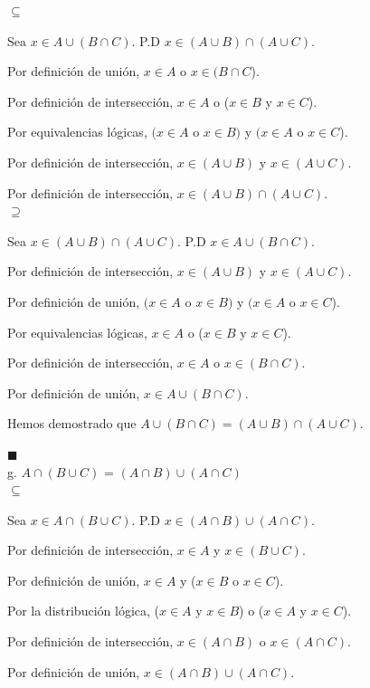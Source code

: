 \documentclass{article}
\begin{document}
\(\subseteq\)

Sea \(x \in A \cup (B \cap C)\). P.D \(x \in (A \cup B) \cap (A \cup C)\).

Por definición de unión, \(x \in A\) o \(x \in (B \cap C\)).

Por definición de intersección, \(x \in A\) o (\(x \in B\) y \(x \in C\)).

Por equivalencias lógicas, \((x \in A\) o \(x \in B)\) y \((x \in A\) o \(x \in C\)).

Por definición de intersección, \(x \in (A \cup B)\) y \(x \in (A \cup C)\).

Por definición de intersección, \(x \in (A \cup B) \cap (A \cup C)\). \\

\(\supseteq\)

Sea \(x \in (A \cup B) \cap (A \cup C)\). P.D \(x \in A \cup (B \cap C)\).

Por definición de intersección, \(x \in (A \cup B)\) y \(x \in (A \cup C)\).

Por definición de unión, \((x \in A\) o \(x \in B)\) y \((x \in A\) o \(x \in C\)).

Por equivalencias lógicas, \(x \in A\) o (\(x \in B\) y \(x \in C\)).

Por definición de intersección, \(x \in A\) o \(x \in (B \cap C)\).

Por definición de unión, \(x \in A \cup (B \cap C)\).

Hemos demostrado que \(A \cup (B \cap C) = (A \cup B) \cap (A \cup C)\).

\(\blacksquare\)\\

    g. $A \cap (B \cup C)$ = $(A \cap B) \cup (A \cap C)$\\

\(\subseteq\)

Sea \(x \in A \cap (B \cup C)\). P.D \(x \in (A \cap B) \cup (A \cap C)\).

Por definición de intersección, \(x \in A\) y \(x \in (B \cup C)\).

Por definición de unión, \(x \in A\) y (\(x \in B\) o \(x \in C\)).

Por la distribución lógica, (\(x \in A\) y \(x \in B\)) o (\(x \in A\) y \(x \in C\)).

Por definición de intersección, \(x \in (A \cap B)\) o \(x \in (A \cap C)\).

Por definición de unión, \(x \in (A \cap B) \cup (A \cap C)\). \\
\end{document}
